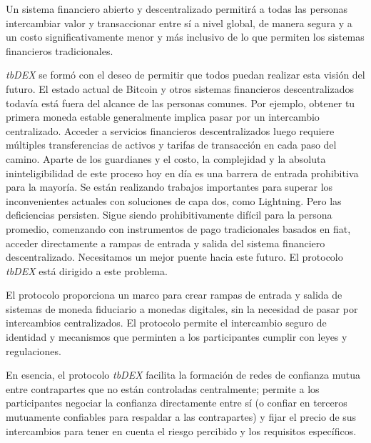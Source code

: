 \documentclass[11pt]{article}
\begin{document}
\vspace{1\baselineskip}
Un sistema financiero abierto y descentralizado permitirá a todas las personas intercambiar valor y transaccionar entre sí a nivel global, de manera segura y a un costo significativamente menor y más inclusivo de lo que permiten los sistemas financieros tradicionales.

\vspace{1\baselineskip}
\textit{tbDEX} se formó con el deseo de permitir que todos puedan realizar esta visión del futuro. El estado actual de Bitcoin y otros sistemas financieros descentralizados todavía está fuera del alcance de las personas comunes. Por ejemplo, obtener tu primera moneda estable generalmente implica pasar por un intercambio centralizado. Acceder a servicios financieros descentralizados luego requiere múltiples transferencias de activos y tarifas de transacción en cada paso del camino. Aparte de los guardianes y el costo, la complejidad y la absoluta ininteligibilidad de este proceso hoy en día es una barrera de entrada prohibitiva para la mayoría. Se están realizando trabajos importantes para superar los inconvenientes actuales con soluciones de capa dos, como Lightning. Pero las deficiencias persisten. Sigue siendo prohibitivamente difícil para la persona promedio, comenzando con instrumentos de pago tradicionales basados en fiat, acceder directamente a rampas de entrada y salida del sistema financiero descentralizado. Necesitamos un mejor puente hacia este futuro. El protocolo \textit{tbDEX} está dirigido a este problema.

\vspace{1\baselineskip}
El protocolo proporciona un marco para crear rampas de entrada y salida de sistemas de moneda fiduciario a monedas digitales, sin la necesidad de pasar por intercambios centralizados. El protocolo permite el intercambio seguro de identidad y mecanismos que perminten a los participantes cumplir con leyes y regulaciones. 

\vspace{1\baselineskip}
En esencia, el protocolo \textit{tbDEX} facilita la formación de redes de confianza mutua entre contrapartes que no están controladas centralmente; permite a los participantes negociar la confianza directamente entre sí (o confiar en terceros mutuamente confiables para respaldar a las contrapartes) y fijar el precio de sus intercambios para tener en cuenta el riesgo percibido y los requisitos específicos. 

\vspace{1\baselineskip}
\end{document}
